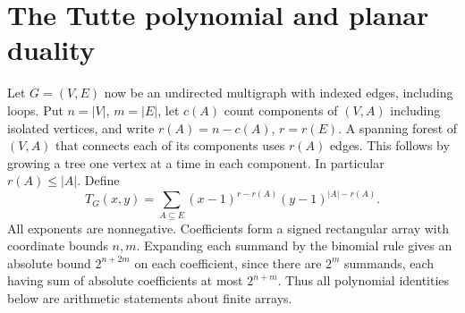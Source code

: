 \section{The Tutte polynomial and planar duality}\label{fl:tutte}

Let $G=(V,E)$ now be an undirected multigraph with indexed edges, including
loops. Put $n=|V|$, $m=|E|$, let $c(A)$ count components of $(V,A)$
including isolated vertices, and write $r(A)=n-c(A)$, $r=r(E)$. A spanning
forest of $(V,A)$ that connects each of its components uses $r(A)$ edges.
This follows by growing a tree one vertex at a time in each component.
In particular $r(A)\le |A|$. Define
\[
 T_G(x,y)=\sum_{A\subseteq E}(x-1)^{r-r(A)}(y-1)^{|A|-r(A)}.
\]
All exponents are nonnegative. Coefficients form a signed rectangular
array with coordinate bounds $n,m$. Expanding each summand by the
binomial rule gives an absolute bound $2^{n+2m}$ on each coefficient,
since there are $2^m$ summands, each having sum of absolute coefficients
at most $2^{n+m}$. Thus all polynomial identities below are arithmetic
statements about finite arrays.

